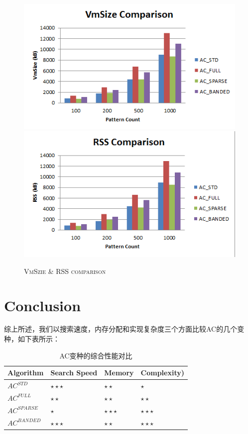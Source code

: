 \documentclass{article}
\begin{document}
\begin{figure}[h]
  \centering
\caption{\textsc{VmSzie \& RSS comparison}}
\includegraphics[scale=0.6]{res/3.png}
\includegraphics[scale=0.6]{res/4.png}
\end{figure}


\section{Conclusion}
综上所述，我们以搜索速度，内存分配和实现复杂度三个方面比较AC的几个变种，如下表所示：
\begin{table}[h]
  \centering
\caption{\textsc{AC变种的综合性能对比}}
\begin{tabular}{ |l|p{2cm}|p{2cm}|p{2cm}| }
\textbf{Algorithm} & \textbf{Search Speed}  & \textbf{Memory} & \textbf{Complexity)}\\
\hline\hline
$AC^{STD}$   & $\star\star\star$ & $\star\star$ & $\star$\\
$AC^{FULL}$  & $\star\star$ & $\star\star$ & $\star\star$\\
$AC^{SPARSE}$ & $\star$  & $\star\star\star$ & $\star\star\star$\\
$AC^{BANDED}$ & $\star\star\star$ & $\star\star$ & $\star\star\star$\\
\hline
\end{tabular}
\end{table}
\end{document}

